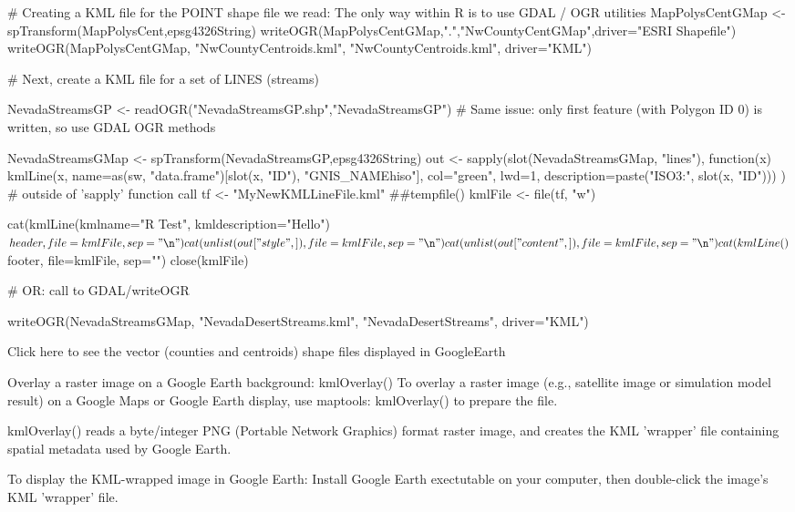 # Creating a KML file for the POINT shape file we read: The only way within R is to use GDAL / OGR utilities  
    MapPolysCentGMap <- spTransform(MapPolysCent,epsg4326String)
   writeOGR(MapPolysCentGMap,".","NwCountyCentGMap",driver="ESRI Shapefile")     writeOGR(MapPolysCentGMap, "NwCountyCentroids.kml", "NwCountyCentroids.kml", driver="KML")   

# Next, create a KML file for a set of LINES (streams) 

   NevadaStreamsGP <- readOGR("NevadaStreamsGP.shp","NevadaStreamsGP") 
 # Same issue: only first feature (with Polygon ID 0) is written, so use GDAL OGR methods

   NevadaStreamsGMap <- spTransform(NevadaStreamsGP,epsg4326String)
   out <- sapply(slot(NevadaStreamsGMap, "lines"), function(x) {
                 kmlLine(x,
                         name=as(sw, "data.frame")[slot(x, "ID"), "GNIS_NAMEhiso"],     
                         col="green", lwd=1, 
                         description=paste("ISO3:", slot(x, "ID")))
                                                             }
                        )  # outside of 'sapply' function call
   tf <- "MyNewKMLLineFile.kml" ##tempfile()
   kmlFile <- file(tf, "w")

   cat(kmlLine(kmlname="R Test", kmldescription="Hello")$header,file=kmlFile, sep="\n")
   cat(unlist(out["style",]), file=kmlFile, sep="\n")
   cat(unlist(out["content",]), file=kmlFile, sep="\n")
   cat(kmlLine()$footer, file=kmlFile, sep="\n")
   close(kmlFile)

# OR: call to GDAL/writeOGR 

   writeOGR(NevadaStreamsGMap, "NevadaDesertStreams.kml", "NevadaDesertStreams", driver="KML")			 

Click here to see the vector (counties and centroids) shape files displayed in GoogleEarth

Overlay a raster image on a Google Earth background: kmlOverlay()
To overlay a raster image (e.g., satellite image or simulation model result) on a Google Maps or Google Earth display, use maptools: kmlOverlay() to prepare the file.

kmlOverlay() reads a byte/integer PNG (Portable Network Graphics) format raster image, and creates the KML 'wrapper' file containing spatial metadata used by Google Earth.

To display the KML-wrapped image in Google Earth: Install Google Earth exectutable on your computer, then double-click the image's KML 'wrapper' file.

